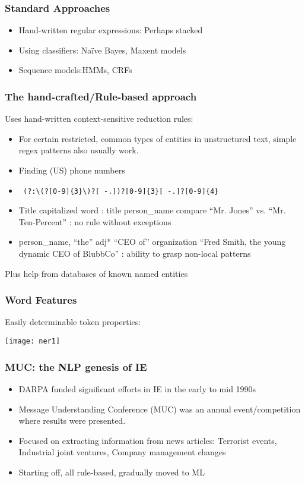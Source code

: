 \begin{frame}[fragile]\frametitle{Standard Approaches}
  \begin{itemize}
  \item Hand-written regular expressions:  Perhaps stacked
  \item Using classifiers: Naïve Bayes, Maxent models
  \item Sequence models:HMMs, CRFs
  \end{itemize}
\end{frame}

\begin{frame}[fragile]\frametitle{The hand-crafted/Rule-based approach}
Uses hand-written context-sensitive reduction rules:
  \begin{itemize}
  \item For certain restricted, common types of entities in unstructured 
text, simple regex patterns also usually work.
  \item Finding (US) phone numbers
  \item \lstinline| (?:\(?[0-9]{3}\)?[ -.])?[0-9]{3}[ -.]?[0-9]{4}|
  \item Title capitalized word : title person\_name compare ``Mr. Jones'' vs. ``Mr. Ten-Percent'' : no rule without exceptions
  \item  person\_name, ``the'' adj* ``CEO of'' organization ``Fred Smith, the young dynamic CEO of BlubbCo'' : ability to grasp non-local patterns
  \end{itemize}
  Plus help from databases of known named entities

\end{frame}

\begin{frame}[fragile]\frametitle{Word Features}
Easily determinable token properties:
\begin{center}
\texttt{[image: ner1]}
\end{center}
\end{frame}

\begin{frame}[fragile]\frametitle{MUC: the NLP genesis of IE}
  \begin{itemize}
  \item DARPA funded significant efforts in IE in the early to mid 1990s
  \item Message Understanding Conference (MUC) was an annual event/competition where results were presented.
  \item Focused on extracting information from news articles: Terrorist events, Industrial joint ventures, Company management changes
  \item Starting off, all rule-based, gradually moved to ML
  \end{itemize}
\end{frame}

